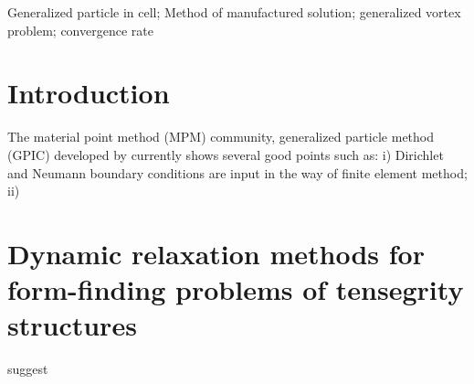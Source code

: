 \documentclass[preprint,3p,12pt]{elsarticle}
\begin{document}
\begin{frontmatter}
\begin{abstract}
\end{abstract}



\begin{keyword}
Generalized particle in cell; Method of manufactured solution; generalized vortex problem; convergence rate
\end{keyword}

\end{frontmatter}

\linenumbers

\section{Introduction}
\label{sec:1}
The material point method (MPM) \citep{Sulsky:CMAME1994a} 
community, generalized particle method (GPIC) developed by \citet{nguyen2020generalized} currently shows several good points such as: i) Dirichlet and Neumann boundary conditions are input in the way of finite element method; ii) 





\section{Dynamic relaxation methods for form-finding problems of tensegrity structures}
\label{sec:2}

\citep{Coombs:CMAME2020a} suggest
\end{document}
